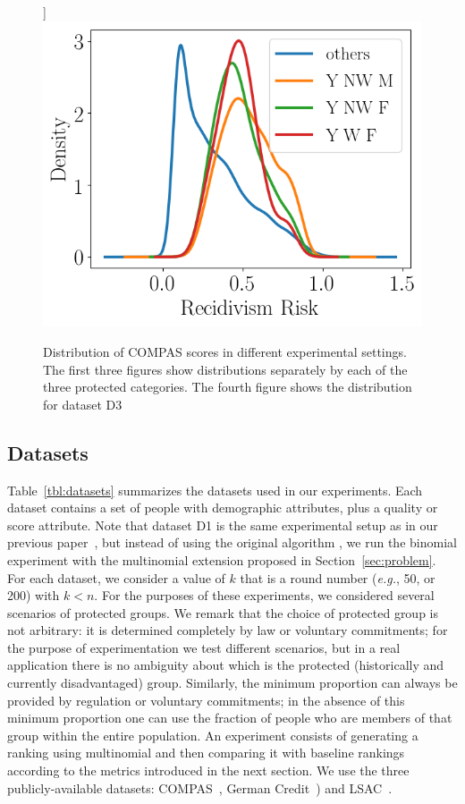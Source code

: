 \begin{figure}[t]
	\label{fig:dataset:compas:worstThree}]
	{\includegraphics[width=.48\textwidth]{pics/compas_worstThreeGroups_kde.png}}\hfill
	\vspace{-3mm}
	\caption{Distribution of COMPAS scores in different experimental settings. The first three figures show distributions separately by each of the three protected categories. The fourth figure shows the distribution for dataset D3}
	\label{fig:dataset:compas}
	\vspace{-3mm}
\end{figure}

\subsection{Datasets}\label{sec:experiments-datasets}


Table~\ref{tbl:datasets} summarizes the datasets used in our experiments.
%
Each dataset contains a set of people with demographic attributes, plus a quality or score attribute.
%
Note that dataset D1 is the same experimental setup as in our previous paper~\cite{zehlike2017fair}, but instead of using the original algorithm \algoFAIR, we run the binomial experiment with the multinomial extension proposed in Section~\ref{sec:problem}.
%
For each dataset, we consider a value of $k$ that is a round number ({\em e.g.}, 50, or 200) with $k<n$.
%
For the purposes of these experiments, we considered several scenarios of protected groups.
%
We remark that the choice of protected group is not arbitrary: it is determined completely by law or voluntary commitments; for the purpose of experimentation we test different scenarios, but in a real application there is no ambiguity about which is the protected (historically and currently disadvantaged) group.
%
Similarly, the minimum proportion can always be provided by regulation or voluntary commitments; in the absence of this minimum proportion one can use the fraction of people who are members of that group within the entire population.
%
An experiment consists of generating a ranking using multinomial \algoFAIR and then comparing it with baseline rankings according to the metrics introduced in the next section.
%
We use the three publicly-available datasets: COMPAS~\cite{angwin_2016_machine}, German Credit~\cite{lichman_2013_uci}) and LSAC~\cite{wightman1998lsac}.

